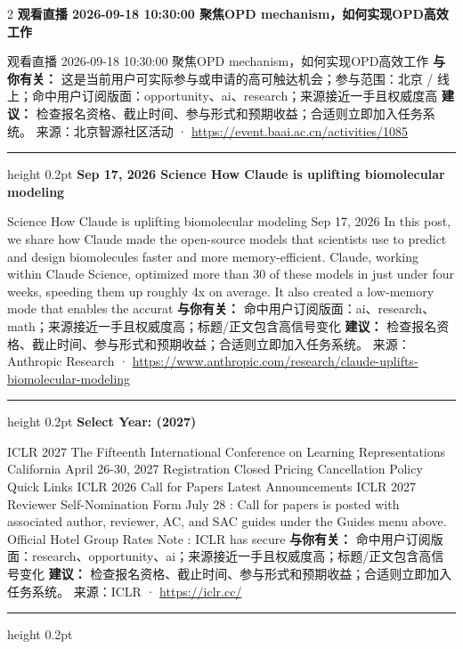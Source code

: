 \documentclass[10.5pt]{ctexart}
\begin{document}
\begin{multicols}{2}
{\large\bfseries 观看直播 2026-09-18 10:30:00 聚焦OPD mechanism，如何实现OPD高效工作}\par
观看直播 2026-09-18 10:30:00 聚焦OPD mechanism，如何实现OPD高效工作
\textbf{与你有关：} 这是当前用户可实际参与或申请的高可触达机会；参与范围：北京 / 线上；命中用户订阅版面：opportunity、ai、research；来源接近一手且权威度高
\textbf{建议：} 检查报名资格、截止时间、参与形式和预期收益；合适则立即加入任务系统。
{\footnotesize\color{ormuted} 来源：北京智源社区活动 · \url{https://event.baai.ac.cn/activities/1085}}
\vspace{2mm}
\hrule height 0.2pt
\vspace{2mm}
{\large\bfseries Sep 17, 2026 Science How Claude is uplifting biomolecular modeling}\par
Science How Claude is uplifting biomolecular modeling Sep 17, 2026 In this post, we share how Claude made the open-source models that scientists use to predict and design biomolecules faster and more memory-efficient. Claude, working within Claude Science, optimized more than 30 of these models in just under four weeks, speeding them up roughly 4x on average. It also created a low-memory mode that enables the accurat
\textbf{与你有关：} 命中用户订阅版面：ai、research、math；来源接近一手且权威度高；标题/正文包含高信号变化
\textbf{建议：} 检查报名资格、截止时间、参与形式和预期收益；合适则立即加入任务系统。
{\footnotesize\color{ormuted} 来源：Anthropic Research · \url{https://www.anthropic.com/research/claude-uplifts-biomolecular-modeling}}
\vspace{2mm}
\hrule height 0.2pt
\vspace{2mm}
{\large\bfseries Select Year: (2027)}\par
ICLR 2027 The Fifteenth International Conference on Learning Representations California April 26-30, 2027 Registration Closed Pricing Cancellation Policy Quick Links ICLR 2026 Call for Papers Latest Announcements ICLR 2027 Reviewer Self-Nomination Form July 28 : Call for papers is posted with associated author, reviewer, AC, and SAC guides under the Guides menu above. Official Hotel Group Rates Note : ICLR has secure
\textbf{与你有关：} 命中用户订阅版面：research、opportunity、ai；来源接近一手且权威度高；标题/正文包含高信号变化
\textbf{建议：} 检查报名资格、截止时间、参与形式和预期收益；合适则立即加入任务系统。
{\footnotesize\color{ormuted} 来源：ICLR · \url{https://iclr.cc/}}
\vspace{2mm}
\hrule height 0.2pt
\vspace{2mm}

\end{multicols}
\end{document}
